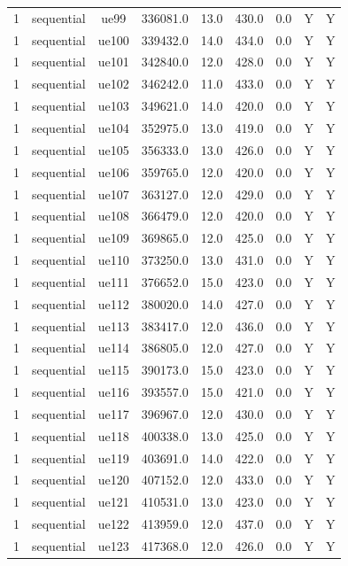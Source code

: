 \begin{table}[ht]
\begin{tabular}{|c|c|c|c|c|c|c|c|c|}
1 & sequential & ue99 & 336081.0 & 13.0 & 430.0 & 0.0 & Y & Y \\
1 & sequential & ue100 & 339432.0 & 14.0 & 434.0 & 0.0 & Y & Y \\
1 & sequential & ue101 & 342840.0 & 12.0 & 428.0 & 0.0 & Y & Y \\
1 & sequential & ue102 & 346242.0 & 11.0 & 433.0 & 0.0 & Y & Y \\
1 & sequential & ue103 & 349621.0 & 14.0 & 420.0 & 0.0 & Y & Y \\
1 & sequential & ue104 & 352975.0 & 13.0 & 419.0 & 0.0 & Y & Y \\
1 & sequential & ue105 & 356333.0 & 13.0 & 426.0 & 0.0 & Y & Y \\
1 & sequential & ue106 & 359765.0 & 12.0 & 420.0 & 0.0 & Y & Y \\
1 & sequential & ue107 & 363127.0 & 12.0 & 429.0 & 0.0 & Y & Y \\
1 & sequential & ue108 & 366479.0 & 12.0 & 420.0 & 0.0 & Y & Y \\
1 & sequential & ue109 & 369865.0 & 12.0 & 425.0 & 0.0 & Y & Y \\
1 & sequential & ue110 & 373250.0 & 13.0 & 431.0 & 0.0 & Y & Y \\
1 & sequential & ue111 & 376652.0 & 15.0 & 423.0 & 0.0 & Y & Y \\
1 & sequential & ue112 & 380020.0 & 14.0 & 427.0 & 0.0 & Y & Y \\
1 & sequential & ue113 & 383417.0 & 12.0 & 436.0 & 0.0 & Y & Y \\
1 & sequential & ue114 & 386805.0 & 12.0 & 427.0 & 0.0 & Y & Y \\
1 & sequential & ue115 & 390173.0 & 15.0 & 423.0 & 0.0 & Y & Y \\
1 & sequential & ue116 & 393557.0 & 15.0 & 421.0 & 0.0 & Y & Y \\
1 & sequential & ue117 & 396967.0 & 12.0 & 430.0 & 0.0 & Y & Y \\
1 & sequential & ue118 & 400338.0 & 13.0 & 425.0 & 0.0 & Y & Y \\
1 & sequential & ue119 & 403691.0 & 14.0 & 422.0 & 0.0 & Y & Y \\
1 & sequential & ue120 & 407152.0 & 12.0 & 433.0 & 0.0 & Y & Y \\
1 & sequential & ue121 & 410531.0 & 13.0 & 423.0 & 0.0 & Y & Y \\
1 & sequential & ue122 & 413959.0 & 12.0 & 437.0 & 0.0 & Y & Y \\
1 & sequential & ue123 & 417368.0 & 12.0 & 426.0 & 0.0 & Y & Y \\

\end{tabular}
\end{table}
